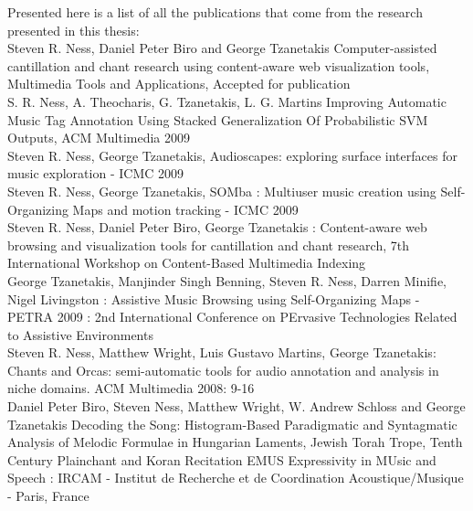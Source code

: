 \label{chapter:publications}

Presented here is a list of all the publications that come from the
research presented in this thesis:
\\

Steven R. Ness, Daniel Peter Biro and George Tzanetakis
Computer-assisted cantillation and chant research using content-aware
web visualization tools, Multimedia Tools and Applications, Accepted
for publication
\\

S. R. Ness, A. Theocharis, G. Tzanetakis, L. G. Martins Improving
Automatic Music Tag Annotation Using Stacked Generalization Of
Probabilistic SVM Outputs, ACM Multimedia 2009
\\

Steven R. Ness, George Tzanetakis, Audioscapes: exploring surface
interfaces for music exploration - ICMC 2009
\\

Steven R. Ness, George Tzanetakis, SOMba : Multiuser music creation
using Self-Organizing Maps and motion tracking - ICMC 2009
\\

Steven R. Ness, Daniel Peter Biro, George Tzanetakis : Content-aware
web browsing and visualization tools for cantillation and chant
research, 7th International Workshop on Content-Based Multimedia
Indexing
\\

George Tzanetakis, Manjinder Singh Benning, Steven R. Ness, Darren
Minifie, Nigel Livingston : Assistive Music Browsing using
Self-Organizing Maps - PETRA 2009 : 2nd International Conference on
PErvasive Technologies Related to Assistive Environments
\\

Steven R. Ness, Matthew Wright, Luis Gustavo Martins, George
Tzanetakis: Chants and Orcas: semi-automatic tools for audio
annotation and analysis in niche domains. ACM Multimedia 2008: 9-16
\\

Daniel Peter Biro, Steven Ness, Matthew Wright, W. Andrew Schloss and
George Tzanetakis Decoding the Song: Histogram-Based Paradigmatic and
Syntagmatic Analysis of Melodic Formulae in Hungarian Laments, Jewish
Torah Trope, Tenth Century Plainchant and Koran Recitation EMUS
Expressivity in MUsic and Speech : IRCAM - Institut de Recherche et de
Coordination Acoustique/Musique - Paris, France
\\
